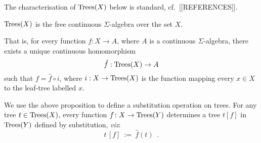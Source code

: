 The characterisation of $\textnormal{Trees}(X)$ below is standard, cf.\ [[REFERENCES]].
\begin{aproposition}
$\textnormal{Trees}(X)$ is the free
    continuous $\Sigma$-algebra over the set $X$.
   \begin{center}
    \end{center}
    That is, for every function $f : X \to A$, where 
    $A$ is a continuous $\Sigma$-algebra,
    there exists a unique continuous homomorphism $$\hat{f} : \textnormal{Trees}(X) \to A$$
    such that $
        f = \hat{f} \circ i $, where $i : X \to \textnormal{Trees}(X)$ is the function mapping every $x \in X$ to the 
        leaf-tree labelled $x$.
 \end{aproposition}
 
 We use the above proposition to define a substitution operation on trees. For any tree $t \in \textnormal{Trees}(X)$, 
 every function $f \colon X \to \textnormal{Trees}(Y)$ determines a tree $t[f]$ in $\textnormal{Trees}(Y)$ defined by substitution, \emph{viz}:
 \[t\,[f] ~ := ~ \hat{f}(t) \enspace .
 \]
